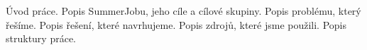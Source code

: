 \begin{introduction}
	Úvod práce. Popis SummerJobu, jeho cíle a cílové skupiny. Popis problému, který řešíme. Popis řešení, které navrhujeme. Popis zdrojů, které jsme použili. Popis struktury práce.
\end{introduction}